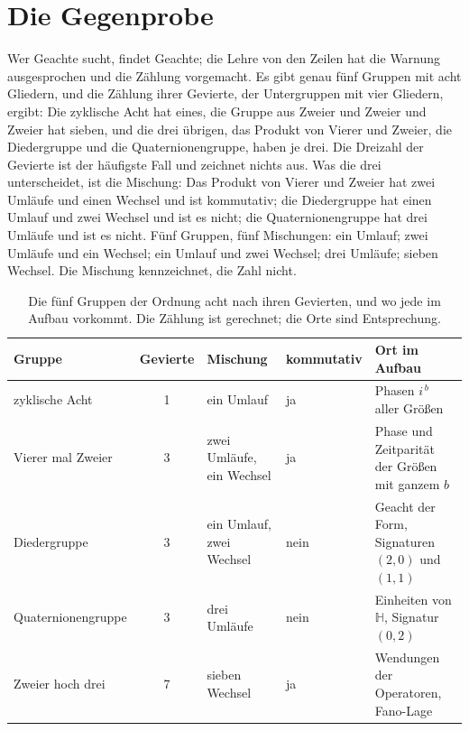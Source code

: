 \documentclass[11pt,a4paper]{article}
\newcommand{\HH}{\mathbb H}
\begin{document}
\section{Die Gegenprobe}
\label{sec:gegenprobe}

Wer Geachte sucht, findet Geachte; die Lehre von den Zeilen hat die Warnung ausgesprochen und die Zählung vorgemacht. Es gibt genau fünf Gruppen mit acht Gliedern, und die Zählung ihrer Gevierte, der Untergruppen mit vier Gliedern, ergibt: Die zyklische Acht hat eines, die Gruppe aus Zweier und Zweier und Zweier hat sieben, und die drei übrigen, das Produkt von Vierer und Zweier, die Diedergruppe und die Quaternionengruppe, haben je drei. Die Dreizahl der Gevierte ist der häufigste Fall und zeichnet nichts aus. Was die drei unterscheidet, ist die Mischung: Das Produkt von Vierer und Zweier hat zwei Umläufe und einen Wechsel und ist kommutativ; die Diedergruppe hat einen Umlauf und zwei Wechsel und ist es nicht; die Quaternionengruppe hat drei Umläufe und ist es nicht. Fünf Gruppen, fünf Mischungen: ein Umlauf; zwei Umläufe und ein Wechsel; ein Umlauf und zwei Wechsel; drei Umläufe; sieben Wechsel. Die Mischung kennzeichnet, die Zahl nicht.

\begin{table}[h]
\centering\small
\renewcommand{\arraystretch}{1.3}
\begin{tabularx}{\textwidth}{@{}l c l l >{\raggedright\arraybackslash}X@{}}
\toprule
Gruppe & Gevierte & Mischung & kommutativ & Ort im Aufbau\\
\midrule
zyklische Acht & 1 & ein Umlauf & ja & Phasen $i^{\,b}$ aller Größen\\
Vierer mal Zweier & 3 & zwei Umläufe, ein Wechsel & ja & Phase und Zeitparität der Größen mit ganzem $b$\\
Diedergruppe & 3 & ein Umlauf, zwei Wechsel & nein & Geacht der Form, Signaturen $(2,0)$ und $(1,1)$\\
Quaternionengruppe & 3 & drei Umläufe & nein & Einheiten von $\HH$, Signatur $(0,2)$\\
Zweier hoch drei & 7 & sieben Wechsel & ja & Wendungen der Operatoren, Fano-Lage\\
\bottomrule
\end{tabularx}
\caption{Die fünf Gruppen der Ordnung acht nach ihren Gevierten, und wo jede im Aufbau vorkommt. Die Zählung ist gerechnet; die Orte sind Entsprechung.}
\label{tab:geachte}
\end{table}
\end{document}
